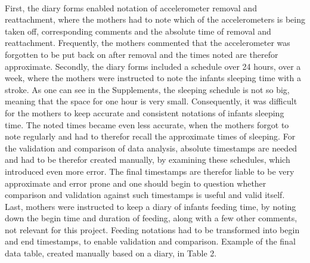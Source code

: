 \documentclass{article}
\begin{document}
{\\First, the diary forms enabled notation of accelerometer removal and reattachment, where the mothers had to note which of the accelerometers is being taken off, corresponding comments and the absolute time of removal and reattachment. Frequently, the mothers commented that the accelerometer was forgotten to be put back on after removal and the times noted are therefor approximate. Secondly, the diary forms included a schedule over 24 hours, over a week, where the mothers were instructed to note the infants sleeping time with a stroke. As one can see in the Supplements, the sleeping schedule is not so big, meaning that the space for one hour is very small. Consequently, it was difficult for the mothers to keep accurate and consistent notations of infants sleeping time. The noted times became even less accurate, when the mothers forgot to note regularly and had to therefor recall the approximate times of sleeping. For the validation and comparison of data analysis, absolute timestamps are needed and had to be therefor created manually, by examining these schedules, which introduced even more error. The final timestamps are therefor liable to be very approximate and error prone and one should begin to question whether comparison and validation against such timestamps is useful and valid itself. \\Last, mothers were instructed to keep a diary of infants feeding time, by noting down the begin time and duration of feeding, along with a few other comments, not relevant for this project. Feeding notations had to be transformed into begin and end timestamps, to enable validation and comparison. Example of the final data table, created manually based on a diary, in Table 2.\\

}
\end{document}
